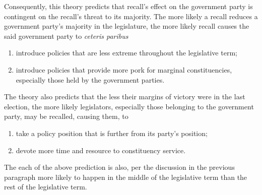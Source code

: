 \documentclass[hyphens, crop=false]{standalone}
\begin{document}
	
	
	
	
	
	Consequently,
	this theory predicts that recall's effect on the government party is contingent
	on the recall's threat to its majority.
	The more likely a recall reduces a government party's
	majority in the legislature,
	the more likely recall causes the said government party to
	\textit{ceteris paribus}
	\begin{enumerate}
		\item
		introduce policies that are less extreme 
		throughout the legislative term;
		\item
		introduce policies that provide more pork
		for marginal constituencies,
		especially those held by the government parties.
	\end{enumerate}
	The theory also predicts that 
	the less their margins of victory were in the last election,
	the more likely
	legislators,
	especially those belonging to the government party,
	may be recalled,
	causing them, 
	to
	\begin{enumerate}
		\item
		take a policy position that is further from its party's position;
		\item
		devote more time and resource to constituency service.
	\end{enumerate}
	The each of the above prediction is also,
	per the discussion in the previous paragraph
	more likely to happen in the middle of the legislative term
	than the rest of the legislative term.
	
\end{document}
